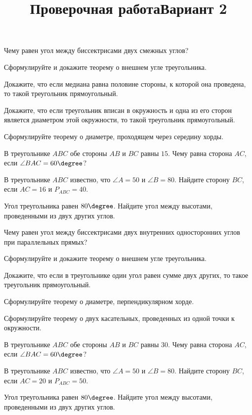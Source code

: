 \begin{listofex}
	\item
	\begin{enumcols}[itemcolumns=1]
		\item Чему равен угол между биссектрисами двух смежных углов?
		\item Сформулируйте и докажите теорему о внешнем угле треугольника.
		\item Докажите, что если медиана равна половине стороны, к которой она проведена, то такой треугольник прямоугольный.
		\item Докажите, что если треугольник вписан в окружность и одна из его сторон является диаметром этой окружности, то такой треугольник прямоугольный.
		\item Сформулируйте теорему о диаметре, проходящем через середину хорды.
	\end{enumcols}
	\item В треугольнике \( ABC \) обе стороны \( AB \) и \( BC \) равны \( 15 \). Чему равна сторона \( AC \), если \( \angle BAC = 60 \degree \)?
	\item В треугольнике \( ABC \) известно, что \( \angle A = 50 \) и \( \angle B = 80 \). Найдите сторону \( BC \), если \( AC = 16 \) и \( P_{ABC}=40 \).
	\item Угол треугольника равен \( 80\degree \). Найдите угол между высотами, проведенными из двух других углов.
	\item {}
	\item {}
\end{listofex}
\newpage
\title{Проверочная работа}
\title{Вариант 2}
\begin{listofex}
	\item
	\begin{enumcols}[itemcolumns=1]
		\item Чему равен угол между биссектрисами двух внутренних односторонних углов при параллельных прямых?
		\item Сформулируйте и докажите теорему о внешнем угле треугольника.
		\item Докажите, что если в треугольнике один угол равен сумме двух других, то такое треугольник прямоугольный.
		\item Сформулируйте теорему о диаметре, перпендикулярном хорде.
		\item Сформулируйте теорему о двух касательных, проведенных из одной точки к окружности.
	\end{enumcols}
	\item В треугольнике \( ABC \) обе стороны \( AB \) и \( BC \) равны \( 30 \). Чему равна сторона \( AC \), если \( \angle BAC = 60 \degree \)?
	\item В треугольнике \( ABC \) известно, что \( \angle A = 50 \) и \( \angle B = 80 \). Найдите сторону \( BC \), если \( AC = 20 \) и \( P_{ABC}=50 \).
	\item Угол треугольника равен \( 80\degree \). Найдите угол между высотами, проведенными из двух других углов.
	\item {}
	\item {}
\end{listofex}
